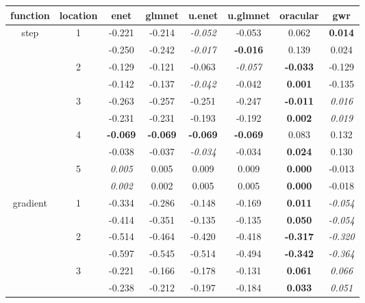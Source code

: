 \documentclass[authoryear, review, 11pt]{elsarticle}
\begin{document}
\begin{table}
\thispagestyle{empty}
\begin{center}
\begin{tabular}{cccccccc}
 function & location & enet & glmnet & u.enet & u.glmnet & oracular & gwr \\ 
  \hline
  \multirow{10}{*}{step} & \multirow{2}{*}{1} & -0.221 & -0.214 & \emph{-0.052} & -0.053 & 0.062 & \textbf{0.014} \\ 
   &  & -0.250 & -0.242 & \emph{-0.017} & \textbf{-0.016} & 0.139 & 0.024 \\ 
   \cline{3-8}
   & \multirow{2}{*}{2} & -0.129 & -0.121 & -0.063 & \emph{-0.057} & \textbf{-0.033} & -0.129 \\ 
   &  & -0.142 & -0.137 & \emph{-0.042} & -0.042 & \textbf{0.001} & -0.135 \\ 
   \cline{3-8}
   & \multirow{2}{*}{3} & -0.263 & -0.257 & -0.251 & -0.247 & \textbf{-0.011} & \emph{0.016} \\ 
   &  & -0.231 & -0.231 & -0.193 & -0.192 & \textbf{0.002} & \emph{0.019} \\ 
   \cline{3-8}
   & \multirow{2}{*}{4} & \textbf{-0.069} & \textbf{-0.069} & \textbf{-0.069} & \textbf{-0.069} & 0.083 & 0.132 \\ 
   &  & -0.038 & -0.037 & \emph{-0.034} & -0.034 & \textbf{0.024} & 0.130 \\ 
   \cline{3-8}
   & \multirow{2}{*}{5} & \emph{0.005} & 0.005 & 0.009 & 0.009 & \textbf{0.000} & -0.013 \\ 
   &  & \emph{0.002} & 0.002 & 0.005 & 0.005 & \textbf{0.000} & -0.018 \\ 
   \hline
  \multirow{10}{*}{gradient} & \multirow{2}{*}{1} & -0.334 & -0.286 & -0.148 & -0.169 & \textbf{0.011} & \emph{-0.054} \\ 
   &  & -0.414 & -0.351 & -0.135 & -0.135 & \textbf{0.050} & \emph{-0.054} \\ 
   \cline{3-8}
   & \multirow{2}{*}{2} & -0.514 & -0.464 & -0.420 & -0.418 & \textbf{-0.317} & \emph{-0.320} \\ 
   &  & -0.597 & -0.545 & -0.514 & -0.494 & \textbf{-0.342} & \emph{-0.364} \\ 
   \cline{3-8}
   & \multirow{2}{*}{3} & -0.221 & -0.166 & -0.178 & -0.131 & \textbf{0.061} & \emph{0.066} \\ 
   &  & -0.238 & -0.212 & -0.197 & -0.184 & \textbf{0.033} & \emph{0.051} \\ 

\end{tabular}
\end{center}
\end{table}
\end{document}
